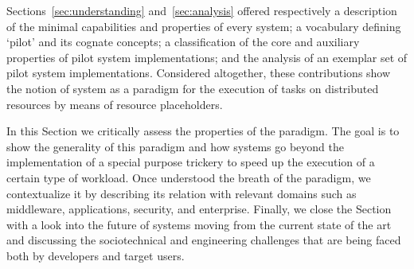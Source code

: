 \documentclass{sig-alternate}
\begin{document}


Sections~\ref{sec:understanding} and~\ref{sec:analysis} offered respectively a
description of the minimal capabilities and properties of every \pilot system;
a vocabulary defining `pilot' and its cognate concepts; a classification of the
core and auxiliary properties of pilot system implementations; and the analysis
of an exemplar set of pilot system implementations. Considered altogether,
these contributions show the notion of \pilot system as a paradigm for the
execution of tasks on distributed resources by means of resource placeholders.

In this Section we critically assess the properties of the \pilot paradigm. The
goal is to show the generality of this paradigm and how \pilot systems go
beyond the implementation of a special purpose trickery to speed up the
execution of a certain type of workload. Once understood the breath of the
\pilot paradigm, we contextualize it by describing its relation with relevant
domains such as middleware, applications, security, and enterprise. Finally, we
close the Section with a look into the future of \pilot systems moving from the
current state of the art and discussing the sociotechnical and engineering
challenges that are being faced both by developers and target users.

\end{document}
